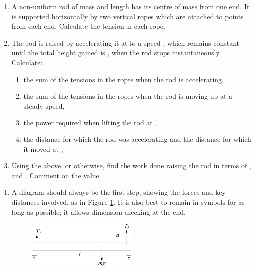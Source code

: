 
\begin{problem} %
{\begin{enumerate}
	\item A non-uniform rod of mass  and length  has its centre of mass  from one end. It is supported horizontally by two vertical ropes which are attached to points  from each end. Calculate the tension in each rope.
	\item The rod is raised by accelerating it at  to a speed , which remains constant until the total height gained is , when the rod stops instantaneously. Calculate:
	\begin{enumerate}
		\item the sum of the tensions in the ropes when the rod is accelerating,
		\item the sum of the tensions in the ropes when the rod is moving up at a steady speed,
		\item the power required when lifting the rod at ,
		\item the distance for which the rod was accelerating and the distance for which it moved at ,
	\end{enumerate}
	\item Using the above, or otherwise, find the work done raising the rod in terms of ,  and . Comment on the value.
\end{enumerate}
}
{}
{\begin{enumerate}
	\item A diagram should always be the first step, showing the forces and key distances involved, as in Figure \ref{fig:Dynamics_rod_forces}. It is also best to remain in symbols for as long as possible; it allows dimension checking at the end.

\begin{figure}[h]
\centering
\includegraphics[width=0.5\textwidth]{../../../figures/Dynamics_rod_forces}
\caption{}\label{fig:Dynamics_rod_forces}
\end{figure}


\end{enumerate}}
\end{problem}
